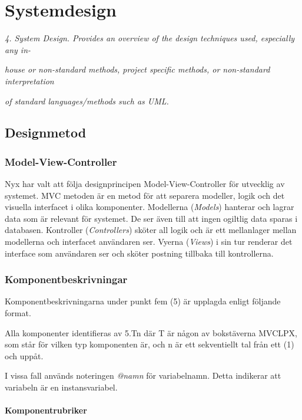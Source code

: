 \documentclass[a4paper, twoside, 11pt, titlepage]{article}
\begin{document}
\clearpage
\section{Systemdesign}


\emph{4. System Design. Provides an overview of the design techniques used, especially any in-}

\emph{house or non-standard methods, project specific methods, or non-standard interpretation}

\emph{of standard languages/methods such as UML.}

	\subsection{Designmetod}



		\subsubsection{Model-View-Controller}


		Nyx har valt att följa designprincipen Model-View-Controller för utvecklig av systemet. MVC metoden är en metod för att separera modeller, logik och det visuella interfacet i olika komponenter. Modellerna (\emph{Models}) hanterar och lagrar data som är relevant för systemet. De ser även till att ingen ogiltlig data sparas i databasen. Kontroller (\emph{Controllers}) sköter all logik och är ett mellanlager mellan modellerna och interfacet användaren ser. Vyerna (\emph{Views}) i sin tur renderar det interface som användaren ser och sköter postning tillbaka till kontrollerna.

		\subsubsection{Komponentbeskrivningar}


		Komponentbeskrivningarna under punkt fem (5) är upplagda enligt följande format.

		Alla komponenter identifieras av 5.Tn där T är någon av bokstäverna MVCLPX, som står för vilken typ komponenten är, och n är ett sekventiellt tal från ett (1) och uppåt.

		I vissa fall används noteringen \emph{@namn} för variabelnamn. Detta indikerar att variabeln är en instansvariabel.

			\paragraph{Komponentrubriker}\
\end{document}
